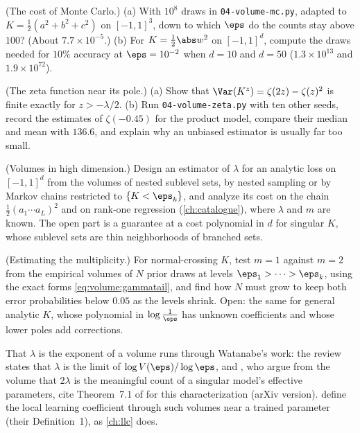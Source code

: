 \begin{refsection}
\begin{exercises}
\item \measurement (The cost of Monte Carlo.) (a) With $10^8$ draws in \texttt{04-volume-mc.py}, adapted to $K=\frac12(a^2+b^2+c^2)$ on $[-1,1]^3$, down to which $\eps$ do the counts stay above $100$? (About $7.7\times10^{-5}$.) (b) For $K=\frac12\abs w^2$ on $[-1,1]^d$, compute the draws needed for $10\%$ accuracy at $\eps=10^{-2}$ when $d=10$ and $d=50$ ($1.3\times10^{13}$ and $1.9\times10^{72}$).\label{ex:volume:cost}

\item \measurement (The zeta function near its pole.) (a) Show that $\Var(K^z)=\zeta(2z)-\zeta(z)^2$ is finite exactly for $z>-\lambda/2$. (b) Run \texttt{04-volume-zeta.py} with ten other seeds, record the estimates of $\zeta(-0.45)$ for the product model, compare their median and mean with $136.6$, and explain why an unbiased estimator is usually far too small.\label{ex:volume:zetamc}

\item \research (Volumes in high dimension.) Design an estimator of $\lambda$ for an analytic loss on $[-1,1]^d$ from the volumes of nested sublevel sets, by nested sampling \parencite{Skilling2006} or by Markov chains restricted to $\{K<\eps_k\}$, and analyze its cost on the chain $\frac12(a_1\cdots a_L)^2$ and on rank-one regression (\cref{ch:catalogue}), where $\lambda$ and $m$ are known. The open part is a guarantee at a cost polynomial in $d$ for singular $K$, whose sublevel sets are thin neighborhoods of branched sets.\label{ex:volume:highdim}

\item \research (Estimating the multiplicity.) For normal-crossing $K$, test $m=1$ against $m=2$ from the empirical volumes of $N$ prior draws at levels $\eps_1>\dots>\eps_k$, using the exact forms \eqref{eq:volume:gammatail}, and find how $N$ must grow to keep both error probabilities below $0.05$ as the levels shrink. Open: the same for general analytic $K$, whose polynomial in $\log\frac1\eps$ has unknown coefficients and whose lower poles add corrections.\label{ex:volume:multiplicity}
\end{exercises}

\notesandrefs
That $\lambda$ is the exponent of a volume runs through Watanabe's work: the review \parencite{Watanabe2024} states that $\lambda$ is the limit of $\log V(\eps)/\log\eps$, and \textcite{WeiEtAl2023}, who argue from the volume that $2\lambda$ is the meaningful count of a singular model's effective parameters, cite Theorem~7.1 of \textcite{Watanabe2009} for this characterization (arXiv version). \Textcite{LauEtAl2025} define the local learning coefficient through such volumes near a trained parameter (their Definition~1), as \cref{ch:llc} does.


\end{refsection}
